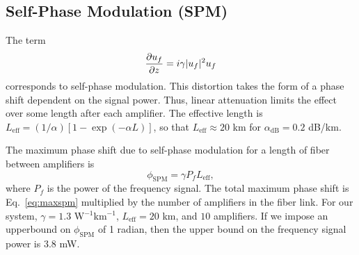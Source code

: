%
%
%
%
%


\subsection{Self-Phase Modulation (SPM)}

The term
\begin{equation}
\frac{\partial u_f}{\partial z} = i\gamma|u_f|^2u_f
\end{equation}
corresponds to self-phase modulation. This distortion takes the form of a phase shift dependent on the signal power. Thus, linear attenuation limits the effect over some length after each amplifier. The effective length is $L_{\text{eff}} = (1/\alpha)[1-\exp(-\alpha L)]$, so that $L_{\text{eff}} \approx 20$ km for $\alpha_{\text{dB}} = 0.2$ dB/km.

The maximum phase shift due to self-phase modulation for a length of fiber between amplifiers is \cite{Agrawal2013}
%
\begin{equation} \label{eq:maxspm}
\phi_{\text{SPM}} = \gamma P_f L_{\text{eff}},
\end{equation}
%
where $P_f$ is the power of the frequency signal. The total maximum phase shift is Eq.~\ref{eq:maxspm} multiplied by the number of amplifiers in the fiber link. For our system, $\gamma = 1.3$ W$^{-1}$km$^{-1}$, $L_{\text{eff}} = 20$ km, and $10$ amplifiers. If we impose an upperbound on $\phi_{\text{SPM}}$ of 1 radian, then the upper bound on the frequency signal power is $3.8$ mW.

